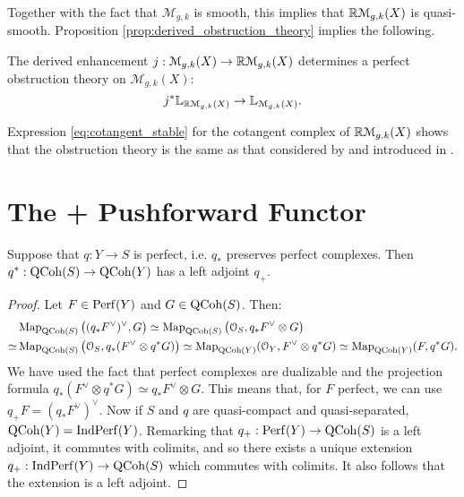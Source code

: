 Together with the fact that $\mathcal{M}_{g,k}$ is smooth, this implies that $\mathbb R\mathcal{M}_{g,k}(X)$ is quasi-smooth.
Proposition \ref{prop:derived_obstruction_theory} implies the following.

\begin{cor}
The derived enhancement $j: \mathcal{M}_{g,k}(X) \to \mathbb R\mathcal{M}_{g,k}(X)$ determines a perfect obstruction theory
on $\mathcal{M}_{g,k}(X)$:
\[	j^* \mathbb L_{\mathbb R\mathcal{M}_{g,k}(X)} \to \mathbb L_{\mathcal{M}_{g,k}(X)}.	\]
\end{cor}

Expression \ref{eq:cotangent_stable} for the cotangent complex of $\mathbb R\mathcal{M}_{g,k}(X)$ shows that the obstruction theory
is the same as that considered by \cite{Behrend_Intrinsic_normal_cone_1997} and introduced in 
.




\section{The + Pushforward Functor}

\begin{lem}
\label{lem:q+}
Suppose that $q: Y \to S$ is perfect, i.e. $q_*$ preserves perfect complexes. Then $q^* : \mathrm{QCoh}(S) \to \mathrm{QCoh}(Y)$ has a left
adjoint $q_+$.
\end{lem}
\begin{proof}
Let $F \in \mathrm{Perf}(Y)$ and $G \in \mathrm{QCoh}(S)$. Then:
\begin{align*}
	&\operatorname{Map}_{\mathrm{QCoh}(S)} \big( (q_*F^{\vee})^{\vee}, G\big) \simeq \operatorname{Map}_{\mathrm{QCoh}(S)} \big( \mathcal{O}_S, q_*F^{\vee} \otimes G\big) \\
\simeq& \operatorname{Map}_{\mathrm{QCoh}(S)} \big(\mathcal{O}_S, q_*(F^{\vee} \otimes q^* G)  \big) \simeq \operatorname{Map}_{\mathrm{QCoh}(Y)}(\mathcal{O}_Y,F^{\vee} \otimes q^*G)
 \simeq \operatorname{Map}_{\mathrm{QCoh}(Y)}(F,q^*G).
\end{align*}
We have used the fact that perfect complexes are dualizable and the projection formula $q_*(F^{\vee} \otimes q^* G)
\simeq q_*F^{\vee} \otimes G$. This means that, for $F$ perfect, we can use $q_+F = (q_*F^{\vee})^{\vee}$. Now if $S$ and $q$
are quasi-compact and quasi-separated, $\mathrm{QCoh}(Y) = \mathrm{Ind} \mathrm{Perf}(Y)$. Remarking that $q_+ : \mathrm{Perf}(Y) \to \mathrm{QCoh}(S)$ is a left
adjoint, it commutes with colimits, and so there exists a unique extension $q_+ : \mathrm{Ind} \mathrm{Perf}(Y) \to \mathrm{QCoh}(S)$ which commutes with
colimits. It also follows that the extension is a left adjoint.
\end{proof}

